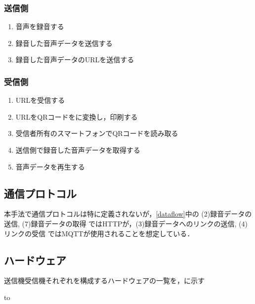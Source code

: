 \documentclass[submit,techrep,noauthor]{ipsj}
\begin{document}
\subsubsection*{送信側}
\begin{enumerate}
    \item 音声を録音する
    \item 録音した音声データを送信する
    \item 録音した音声データのURLを送信する 
\end{enumerate}

\subsubsection*{受信側}
\begin{enumerate}
    \item URLを受信する 
    \item URLをQRコードをに変換し，印刷する 
    \item 受信者所有のスマートフォンでQRコードを読み取る 
    \item 送信側で録音した音声データを取得する 
    \item 音声データを再生する       
\end{enumerate}


\subsection{通信プロトコル}
本手法で通信プロトコルは特に定義されないが，\ref{dataflow}中の (2)録音データの送信, (7)録音データの取得 ではHTTPが，(3)録音データへのリンクの送信, (4)リンクの受信 ではMQTTが使用されることを想定している．

\subsection{ハードウェア}
送信機受信機それぞれを構成するハードウェアの一覧を，に示す

\begin{table}[tb] 
\caption{ハードウェア一覧} 
\label{tab:sys-hardwares}
\hbox to
\end{table}
\end{document}
